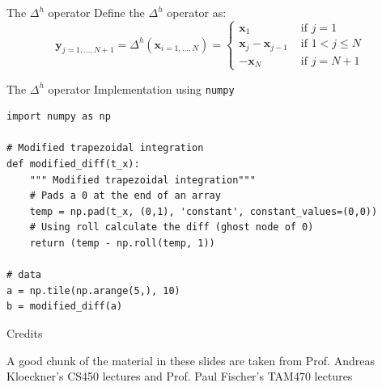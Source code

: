 \documentclass[presentation]{beamer}
\begin{document}
\begin{frame}[label={sec:orge5366ac}]{The \(\Delta^{h}\) operator}
Define the \(\Delta^{h}\) operator as:
\[\mathbf{y}_{j=1, \ldots, N+1}=\Delta^{h}\left(\mathbf{x}_{i=1, \ldots,
   N}\right)=\left\{\begin{array}{ll}{\mathbf{x}_{1}} & {\text { if } j=1}
   \\ {\mathbf{x}_{j}-\mathbf{x}_{j-1}} & {\text { if } 1<j \leq N}
   \\ {-\mathbf{x}_{N}} & {\text { if } j=N+1}\end{array}\right. \]
\end{frame}
\begin{frame}[label={sec:org8cd01d1},fragile]{The \(\Delta^{h}\) operator}
 Implementation using \texttt{numpy}
\begin{verbatim}
import numpy as np

# Modified trapezoidal integration
def modified_diff(t_x):
    """ Modified trapezoidal integration"""
    # Pads a 0 at the end of an array
    temp = np.pad(t_x, (0,1), 'constant', constant_values=(0,0))
    # Using roll calculate the diff (ghost node of 0)
    return (temp - np.roll(temp, 1))

# data
a = np.tile(np.arange(5,), 10)
b = modified_diff(a)
\end{verbatim}
\end{frame}
\begin{frame}[label={sec:org08928ce}]{Credits}
\begin{block}{A good chunk of the material in these slides are taken from Prof. Andreas Kloeckner's CS450 lectures and Prof. Paul Fischer's TAM470 lectures}
\end{block}
\end{frame}
\end{document}
